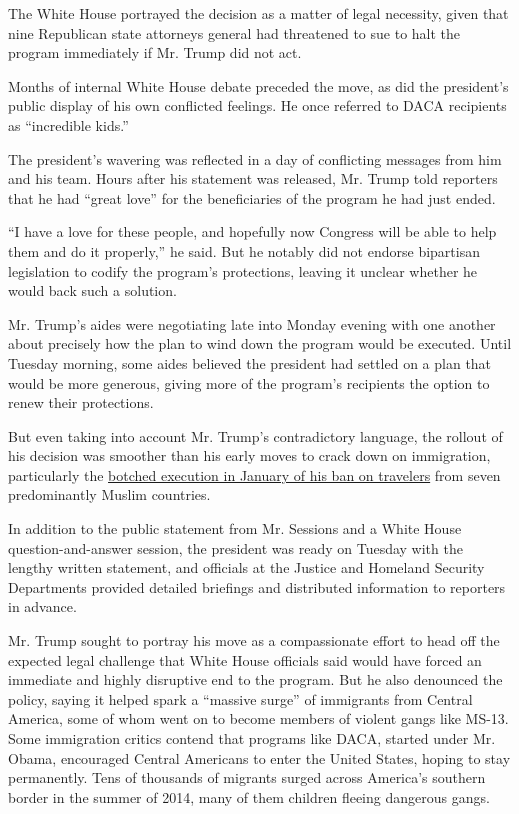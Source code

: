 The White House portrayed the decision as a matter of legal necessity,
given that nine Republican state attorneys general had threatened to sue
to halt the program immediately if Mr. Trump did not act.

Months of internal White House debate preceded the move, as did the
president's public display of his own conflicted feelings. He once
referred to DACA recipients as ``incredible kids.''

The president's wavering was reflected in a day of conflicting messages
from him and his team. Hours after his statement was released, Mr. Trump
told reporters that he had ``great love'' for the beneficiaries of the
program he had just ended.

``I have a love for these people, and hopefully now Congress will be
able to help them and do it properly,'' he said. But he notably did not
endorse bipartisan legislation to codify the program's protections,
leaving it unclear whether he would back such a solution.

Mr. Trump's aides were negotiating late into Monday evening with one
another about precisely how the plan to wind down the program would be
executed. Until Tuesday morning, some aides believed the president had
settled on a plan that would be more generous, giving more of the
program's recipients the option to renew their protections.

But even taking into account Mr. Trump's contradictory language, the
rollout of his decision was smoother than his early moves to crack down
on immigration, particularly the
\href{https://www.nytimes3xbfgragh.onion/2017/01/29/us/politics/donald-trump-rush-immigration-order-chaos.html}{botched
execution in January of his ban on travelers} from seven predominantly
Muslim countries.

In addition to the public statement from Mr. Sessions and a White House
question-and-answer session, the president was ready on Tuesday with the
lengthy written statement, and officials at the Justice and Homeland
Security Departments provided detailed briefings and distributed
information to reporters in advance.

Mr. Trump sought to portray his move as a compassionate effort to head
off the expected legal challenge that White House officials said would
have forced an immediate and highly disruptive end to the program. But
he also denounced the policy, saying it helped spark a ``massive surge''
of immigrants from Central America, some of whom went on to become
members of violent gangs like MS-13. Some immigration critics contend
that programs like DACA, started under Mr. Obama, encouraged Central
Americans to enter the United States, hoping to stay permanently. Tens
of thousands of migrants surged across America's southern border in the
summer of 2014, many of them children fleeing dangerous gangs.

